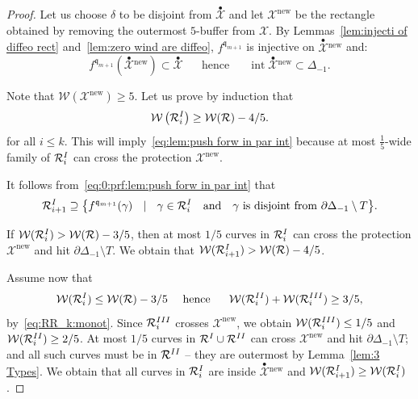 \documentclass{amsart}
\renewcommand{\sp}{{\ \ }}
\newcommand{\1}{{\mathbb 1 }}
\newcommand{\upbullet}[1]{\overset{\bullet}{ #1}{}}
\newcommand{\Width}{{\mathcal W}}
\newcommand\RR{\mathcal{R}}
\newcommand\XX{\mathcal{X}}
\newcommand\intr{\operatorname{int}}
\newcommand{\qq}{\mathfrak{q}}
\newcommand\new{{\operatorname{new}}}
\theoremstyle{remark}
\numberwithin{equation}{section}
\theoremstyle{definition}
\newcommand{\RN}[1]{\MakeUppercase{\romannumeral#1}}%
\begin{document}
\begin{proof}
Let us choose $\delta$ to be disjoint from $\upbullet \XX$ and let $\XX^\new$ be the rectangle obtained by removing the outermost $5$-buffer from $\XX$. By Lemmas~\ref{lem:injecti of diffeo rect} and~\ref{lem:zero wind are diffeo}, $f^{\qq_{m+1}}$ is injective on $ \upbullet \XX^\new$ and:  
\begin{equation}
\label{eq:0:prf:lem:push forw in par int}
f^{\qq_{m+1}} \left( \upbullet \XX^\new \right)\subset \upbullet \XX\sp\sp\sp \text{ hence }\sp\sp\sp  \intr\upbullet \XX^\new\subset \Delta_{-1}.
\end{equation}

Note that $\Width(\XX^\new) \ge 5$. Let us prove by induction that  
\begin{equation}
\label{eq:prf:lem:push forw in par int}
 \Width\left(\RR_i^{\RN{1}}\right)\ge \Width(\RR)-4/5.
\end{equation} 
for all $i\le k$. This will imply~\eqref{eq:lem:push forw in par int} because at most $\frac 1 {5}$-wide family of $\RR_i^{\RN{1}}$ can cross the protection $\XX^\new$.

It follows from~\eqref{eq:0:prf:lem:push forw in par int} that
\begin{equation}
\label{eq:1:lem:push forw in par int}
\RR^{\RN{1}}_{i+1} \supseteq\big\{f^{\qq_{m+1}} (\gamma)\sp \mid \sp \gamma\in \RR^{\RN{1}}_{i}\sp \text{ and }\sp \gamma \text{ is disjoint from } \partial \Delta_{-1}\setminus T\big\}.
\end{equation} 

If $\Width(\RR^{\RN{1}}_{i})> \Width(\RR)-3/5$, then at most $1/5$ curves in $\RR^{\RN{1}}_{i}$ can cross the protection $\XX^\new$ and  hit $\partial \Delta_{-1}\setminus T$. We obtain that $\Width(\RR^{\RN{1}}_{i+1})> \Width(\RR)-4/5$.

Assume now that \[\Width(\RR^{\RN{1}}_{i})\le  \Width(\RR)-3/5 \sp\sp \text{hence }\sp\sp \Width(\RR^{\RN{2}}_{i})+\Width(\RR^{\RN{3}}_{i})\ge 3/5,\]
by~\eqref{eq:RR_k:monot}. Since $\RR^{\RN{3}}_{i}$ crosses $\XX^\new$, we obtain $\Width(\RR^{\RN{3}}_{i})\le 1/5$ and $\Width(\RR^{\RN{2}}_{i})\ge 2/5$. At most $1/5$ curves in $\RR^{\RN{1}}\cup \RR^{\RN{2}}$ can cross $\XX^\new$ and hit $\partial \Delta_{-1}\setminus T$; and all such curves must be in $\RR^{\RN{2}}$ -- they are outermost by Lemma~\ref{lem:3 Types}. We obtain that all curves in $\RR^{\RN{1}}_{i}$ are inside $\upbullet \XX^\new$ and 
$\Width(\RR^{\RN{1}}_{i+1})\ge \Width(\RR^{\RN{1}}_{i})$.
\end{proof}
\end{document}
